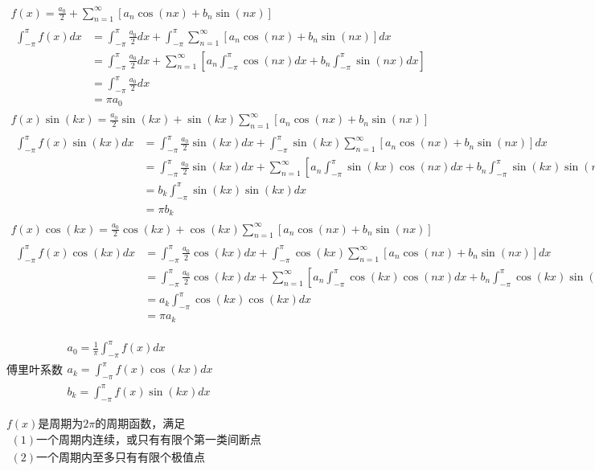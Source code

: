 \documentclass[UTF8]{ctexart}
\newcommand{\mt}[1]{\text{#1}}
\newcommand{\mf}[1]{\left( #1\right)}
\newcommand{\mfc}[1]{\left[ #1 \right]}
\newcommand{\ma}[1]{\begin{array}{llll} #1 \end{array}}
\begin{document}
$\ma{
    f\mf{x}=\frac{a_0}{2}+\sum_{n=1}^\infty \mfc{a_n\cos \mf{nx} +b_n\sin \mf{nx}}\\
    \ma{\int_{-\pi}^\pi f\mf{x}dx&=\int_{-\pi}^\pi \frac{a_0}{2}dx+\int_{-\pi}^\pi \sum_{n=1}^\infty \mfc{a_n\cos \mf{nx} +b_n\sin \mf{nx}}dx\\
        &=\int_{-\pi}^\pi \frac{a_0}{2}dx+ \sum_{n=1}^\infty \mfc{a_n\int_{-\pi}^\pi\cos \mf{nx}dx +b_n\int_{-\pi}^\pi\sin \mf{nx}dx}\\
        &=\int_{-\pi}^\pi  \frac{a_0}{2}dx\\
        &=\pi a_0
    }\\

    f\mf{x}\sin \mf{kx}=\frac{a_0}{2}\sin \mf{kx}+ \sin \mf{kx}\sum_{n=1}^\infty \mfc{a_n\cos \mf{nx} +b_n\sin \mf{nx}}\\
    \ma{\int_{-\pi}^\pi f\mf{x}\sin \mf{kx} dx &=\int_{-\pi}^\pi\frac{a_0}{2}\sin \mf{kx} dx+ \int_{-\pi}^\pi\sin \mf{kx}\sum_{n=1}^\infty \mfc{a_n\cos \mf{nx} +b_n\sin \mf{nx}}dx\\
        &=\int_{-\pi}^\pi\frac{a_0}{2}\sin \mf{kx} dx+ \sum_{n=1}^\infty \mfc{a_n \int_{-\pi}^\pi\sin \mf{kx}\cos \mf{nx}dx +b_n\int_{-\pi}^\pi\sin \mf{kx}\sin \mf{nx}dx}\\
        &=b_k \int_{-\pi}^\pi\sin \mf{kx}\sin \mf{kx}dx\\
        &=\pi b_k
    }\\
    f\mf{x}\cos \mf{kx}=\frac{a_0}{2}\cos \mf{kx}+ \cos \mf{kx}\sum_{n=1}^\infty \mfc{a_n\cos \mf{nx} +b_n\sin \mf{nx}}\\
    \ma{\int_{-\pi}^\pi f\mf{x}\cos \mf{kx} dx &=\int_{-\pi}^\pi\frac{a_0}{2}\cos \mf{kx} dx+ \int_{-\pi}^\pi\cos \mf{kx}\sum_{n=1}^\infty \mfc{a_n\cos \mf{nx} +b_n\sin \mf{nx}}dx\\
        &=\int_{-\pi}^\pi\frac{a_0}{2}\cos \mf{kx} dx+ \sum_{n=1}^\infty \mfc{a_n \int_{-\pi}^\pi\cos \mf{kx}\cos \mf{nx}dx +b_n\int_{-\pi}^\pi\cos \mf{kx}\sin \mf{nx}dx}\\
        &=a_k \int_{-\pi}^\pi\cos \mf{kx}\cos \mf{kx}dx\\
        &=\pi a_k
    }
}$

傅里叶系数$\ma{
    a_0=\frac{1}{\pi}\int_{-\pi}^\pi f\mf{x}dx\\
    a_k=\int_{-\pi}^\pi f\mf{x}\cos \mf{kx} dx\\
    b_k=\int_{-\pi}^\pi f\mf{x}\sin \mf{kx} dx
}$


$f\mf{x}$是周期为$2\pi$的周期函数，满足$\ma{
    \mf{1}\mt{一个周期内连续，或只有有限个第一类间断点}\\
    \mf{2}\mt{一个周期内至多只有有限个极值点}
}$
\end{document}
